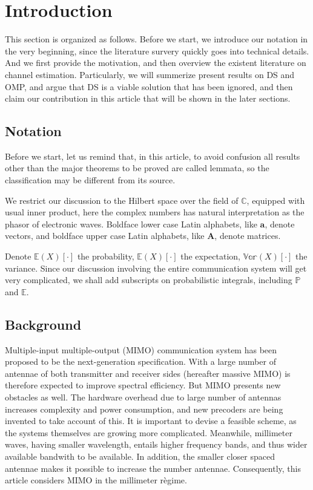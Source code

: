 \documentclass[12pt]{article}
\begin{document}
\section{Introduction}

This section is organized as follows.
Before we start, we introduce our notation in the very beginning, since the literature survery quickly goes into technical details.
And we first provide the motivation, and then overview the existent literature on channel estimation.
Particularly, we will summerize present results on DS and OMP, and argue that DS is a viable solution that has been ignored, and then claim our contribution in this article that will be shown in the later sections.

\subsection{Notation}

Before we start, let us remind that, in this article, to avoid confusion all results other than the major theorems to be proved are called lemmata, so the classification may be different from its source.

We restrict our discussion to the Hilbert space over the field of \(\mathbb{C}\), equipped with usual inner product, here the complex numbers has natural interpretation as the phasor of electronic waves.
Boldface lower case Latin alphabets, like \(\mathbf{a}\), denote vectors, and boldface upper case Latin alphabets, like \(\mathbf{A}\), denote matrices.

Denote \(\mathbb{E}(X)[\cdot]\) the probability, \(\mathbb{E}(X)[\cdot]\) the expectation, \(\mathbb{Var}(X)[\cdot]\) the variance.
Since our discussion involving the entire communication system will get very complicated, we shall add subscripts on probabilistic integrals, including \(\mathbb{P}\) and \(\mathbb{E}\).


\subsection{Background}

Multiple-input multiple-output (MIMO) communication system has been proposed to be the next-generation specification.
With a large number of antennae of both transmitter and receiver sides (hereafter massive MIMO) is therefore expected to improve spectral efficiency.
But MIMO presents new obstacles as well.
The hardware overhead due to large number of antennas increases complexity and power consumption, and new precoders are being invented to take account of this.
It is important to devise a feasible scheme, as the systems themselves are growing more complicated.
Meanwhile, millimeter waves, having smaller wavelength, entails higher frequency bands, and thus wider available bandwith to be available.
In addition, the smaller closer spaced antennae makes it possible to increase the number antennae.
Consequently, this article considers MIMO in the millimeter r\`egime.
\end{document}
